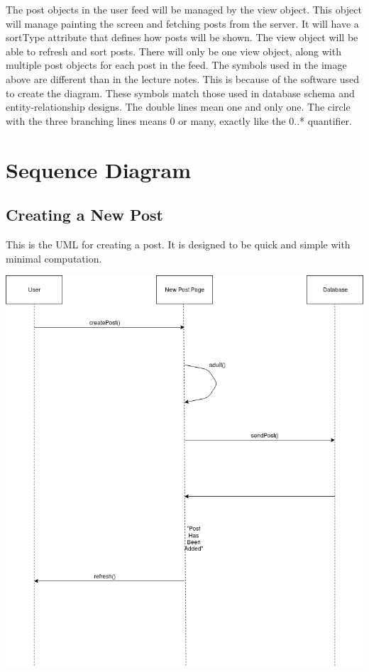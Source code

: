 \documentclass[12pt]{article}
\begin{document}
      The post objects in the user feed will be managed by the view object.  This object will manage painting the screen and fetching posts from the server.  It will have a sortType attribute that defines how posts will be shown.  The view object will be able to refresh and sort posts.  There will only be one view object, along with multiple post objects for each post in the feed.
      The symbols used in the image above are different than in the lecture notes.  This is because of the software used to create the diagram.  These symbols match those used in database schema and entity-relationship designs.  The double lines mean one and only one.  The circle with the three branching lines means 0 or many, exactly like the 0..* quantifier.

\section{Sequence Diagram}
\subsection{Creating a New Post}
This is the UML for creating a post. It is designed to be quick and simple with minimal computation.

\includegraphics[scale=0.85]{img/uml/createPost}
\end{document}
